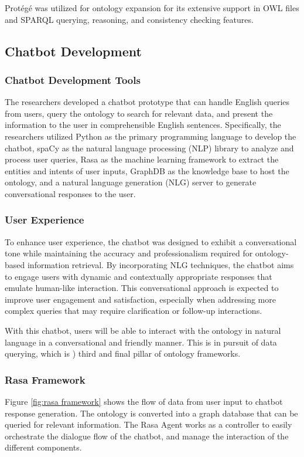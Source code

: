     Protégé was utilized for ontology expansion for its extensive support in OWL files and SPARQL querying, reasoning, and consistency checking features.

\subsection{Chatbot Development}
\subsubsection{Chatbot Development Tools}
    The researchers developed a chatbot prototype that can handle English queries from users, query the ontology to search for relevant data, and present the information to the user in comprehensible English sentences. Specifically, the researchers utilized Python as the primary programming language to develop the chatbot, spaCy as the natural language processing (NLP) library to analyze and process user queries, Rasa as the machine learning framework to extract the entities and intents of user inputs, GraphDB as the knowledge base to host the ontology, and a natural language generation (NLG) server to generate conversational responses to the user.

\subsubsection{User Experience}
    To enhance user experience, the chatbot was designed to exhibit a conversational tone while maintaining the accuracy and professionalism required for ontology-based information retrieval. By incorporating NLG techniques, the chatbot aims to engage users with dynamic and contextually appropriate responses that emulate human-like interaction. This conversational approach is expected to improve user engagement and satisfaction, especially when addressing more complex queries that may require clarification or follow-up interactions.

    With this chatbot, users will be able to interact with the ontology in natural language in a conversational and friendly manner. This is in pursuit of data querying, which is ) third and final pillar of ontology frameworks. 

\subsubsection{Rasa Framework}
    Figure \ref{fig:rasa framework} shows the flow of data from user input to chatbot response generation. The ontology is converted into a graph database that can be queried for relevant information. The Rasa Agent works as a controller to easily orchestrate the dialogue flow of the chatbot, and manage the interaction of the different components. 
    
